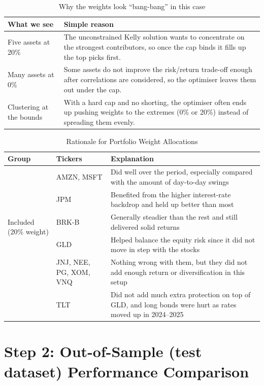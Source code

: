 \documentclass[11pt,a4paper]{article}
\begin{document}
\begin{table}[H]
\centering
\caption{Why the weights look ``bang-bang'' in this case}
\label{tab:bang_bang}
{\small\setlength{\tabcolsep}{4pt}\renewcommand{\arraystretch}{1.15}\begin{tabularx}{\textwidth}{>{\raggedright\arraybackslash}p{4.4cm} X}
\toprule
What we see & Simple reason \\
\midrule
Five assets at 20\% & The unconstrained Kelly solution wants to concentrate on the strongest contributors, so once the cap binds it fills up the top picks first. \\
Many assets at 0\% & Some assets do not improve the risk/return trade-off enough after correlations are considered, so the optimiser leaves them out under the cap. \\
Clustering at the bounds & With a hard cap and no shorting, the optimiser often ends up pushing weights to the extremes (0\% or 20\%) instead of spreading them evenly. \\
\bottomrule
\end{tabularx}}
\end{table}
\begin{table}[H]
\centering
\caption{Rationale for Portfolio Weight Allocations}
\label{tab:weight_interpretation}
{\setlength{\tabcolsep}{4pt}\begin{tabularx}{\textwidth}{l l X}
\toprule
Group & Tickers & Explanation\\
\midrule
\multirow{5}{*}{Included (20\% weight)} 
& AMZN, MSFT & Did well over the period, especially compared with the amount of day-to-day swings \\
& JPM & Benefited from the higher interest-rate backdrop and held up better than most \\
& BRK-B & Generally steadier than the rest and still delivered solid returns \\
& GLD & Helped balance the equity risk since it did not move in step with the stocks \\
\midrule
\multirow{2}{*}{Excluded (0\% weight)}
& JNJ, NEE, PG, XOM, VNQ & Nothing wrong with them, but they did not add enough return or diversification in this setup \\
& TLT & Did not add much extra protection on top of GLD, and long bonds were hurt as rates moved up in 2024--2025 \\
\bottomrule
\end{tabularx}}
\end{table}

\section{Step 2: Out-of-Sample (test dataset) Performance Comparison}
\end{document}
